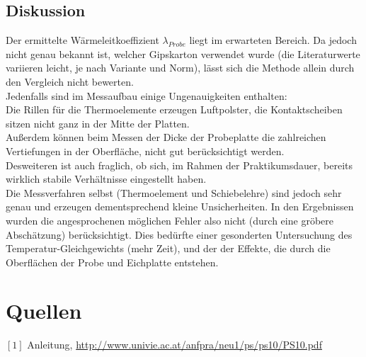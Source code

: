 \documentclass[12pt,a4paper]{article}
\begin{document}
\begin{multicols}{2}
\subsection{Diskussion}
Der ermittelte Wärmeleitkoeffizient $\lambda_{Probe}$ liegt im erwarteten Bereich. Da jedoch nicht genau bekannt ist, welcher Gipskarton verwendet wurde (die Literaturwerte variieren leicht, je nach Variante und Norm), lässt sich die Methode allein durch den Vergleich nicht bewerten.\\
Jedenfalls sind im Messaufbau einige Ungenauigkeiten enthalten:\\
Die Rillen für die Thermoelemente erzeugen Luftpolster, die Kontaktscheiben sitzen nicht ganz in der Mitte der Platten.\\
Außerdem können beim Messen der Dicke der Probeplatte die zahlreichen Vertiefungen in der Oberfläche, nicht gut berücksichtigt werden.\\
Desweiteren ist auch fraglich, ob sich, im Rahmen der Praktikumsdauer, bereits wirklich stabile Verhältnisse eingestellt haben.\\
Die Messverfahren selbst (Thermoelement und Schiebelehre) sind jedoch sehr genau und erzeugen dementsprechend kleine Unsicherheiten. In den Ergebnissen wurden die angesprochenen möglichen Fehler also nicht (durch eine gröbere Abschätzung) berücksichtigt. Dies bedürfte einer gesonderten Untersuchung des Temperatur-Gleichgewichts (mehr Zeit), und der der Effekte, die durch die Oberflächen der Probe und Eichplatte entstehen.\\


\section{Quellen}
$[1]$ Anleitung, \url{http://www.univie.ac.at/anfpra/neu1/ps/ps10/PS10.pdf}\\

\end{multicols}
\end{document}
